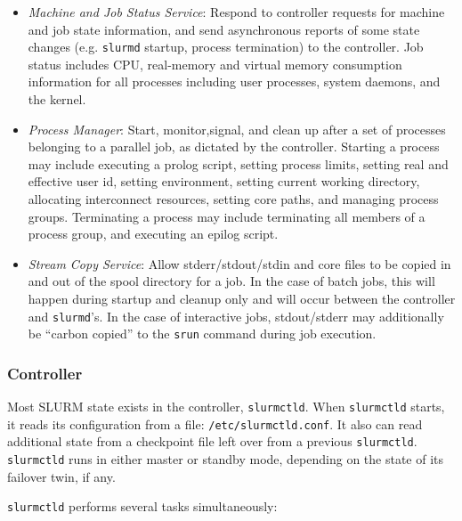 \begin{itemize}
\item {\em Machine and Job Status Service}:  Respond to controller 
requests for machine and job state information, and send asynchronous 
reports of some state changes (e.g. {\tt slurmd} startup, process 
termination) to the controller.
Job status includes CPU, real-memory and virtual memory consumption 
information for all processes including user processes, system daemons, 
and the kernel. 

\item{\em Process Manager}:  Start, monitor,signal, and clean up after
a set of processes belonging to a parallel job, as dictated by the
controller.  Starting a process may include executing a prolog script, 
setting process limits, setting real and effective
user id, setting environment, setting current working directory, allocating 
interconnect resources, setting core paths, and managing process groups.  
Terminating a process may include terminating all members of a process 
group, and executing an epilog script.

\item{\em Stream Copy Service}:  Allow stderr/stdout/stdin and core files
to be copied in and out of the spool directory for a job.  In the case
of batch jobs, this will happen during startup and cleanup only and will
occur between the controller and {\tt slurmd}'s.
In the case of interactive jobs, stdout/stderr may additionally be ``carbon 
copied'' to the {\tt srun} command during job execution.

\end{itemize}

\subsubsection{Controller}

Most SLURM state exists in the controller, {\tt slurmctld}. 
When {\tt slurmctld} starts, it reads its configuration from a file:
{\tt /etc/slurmctld.conf}.  It also can read additional state from a 
checkpoint file left over from a previous {\tt slurmctld}.
{\tt slurmctld} runs in either master or standby mode, depending
on the state of its failover twin, if any.  

{\tt slurmctld} performs several tasks simultaneously:

